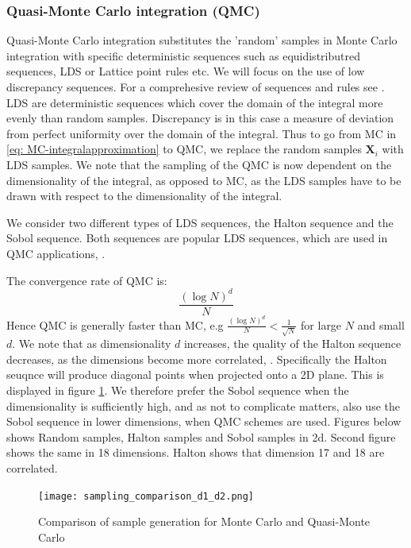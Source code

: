 \documentclass[11pt]{article}
\begin{document}
\subsubsection{Quasi-Monte Carlo integration (QMC)} \label{Subsubsection: QMC}
Quasi-Monte Carlo integration substitutes the 'random' samples in Monte Carlo integration 
with specific deterministic sequences such as equidistributred sequences, \ac{LDS} or Lattice point rules etc.
We will focus on the use of low discrepancy sequences. For a comprehesive review of sequences and rules see \textcite{Judd1998Book}.\\
\ac{LDS} are deterministic sequences which cover the domain of the integral more evenly than random samples. 
Discrepancy is in this case a measure of deviation from perfect uniformity over the domain of the integral.
Thus to go from MC in \eqref{eq: MC-integralapproximation} to QMC, we replace the random samples $\mathbf{X}_i$ with \ac{LDS} samples.
We note that the sampling of the QMC is now dependent on the dimensionality of the integral, as opposed to MC,
as the LDS samples have to be drawn with respect to the dimensionality of the integral.

We consider two different types of \ac{LDS} sequences, the Halton sequence and the Sobol sequence.
Both sequences are popular \ac{LDS} sequences,
which are used in \ac{QMC} applications, \autocite{Glasserman2004MC}.

The convergence rate of \ac{QMC} is:
\begin{equation} \label{eq: QMC-convergence}
  \frac{\left( \log N \right)^{d}}{N}
\end{equation}
Hence QMC is generally faster than MC, e.g $\frac{\left( \log N \right)^{d}}{N} < \frac{1}{\sqrt{N}}$ for large $N$ and small $d$.
We note that as dimensionality $d$ increases, the quality of the Halton sequence decreases, as the dimensions become more correlated, \textcite{Glasserman2004MC}.
Specifically the Halton seuqnce will produce diagonal points when projected onto a 2D plane.
This is displayed in figure \ref{fig: Sampling_comparison_MC_D1D2}. 
We therefore prefer the Sobol sequence when the dimensionality is sufficiently high,
and as not to complicate matters, also use the Sobol sequence in lower dimensions, when \ac{QMC} schemes are used.
Figures below shows Random samples, Halton samples and Sobol samples in 2d.
Second figure shows the same in 18 dimensions. Halton shows that dimension 17 and 18 are correlated.
\begin{figure}[h!]
  \begin{center}
  \caption{Comparison of sample generation for Monte Carlo and Quasi-Monte Carlo} 
  \label{fig: Sampling_comparison_MC_D1D2}
  \texttt{[image: sampling\_comparison\_d1\_d2.png]}
  \end{center}
\end{figure}
\end{document}
